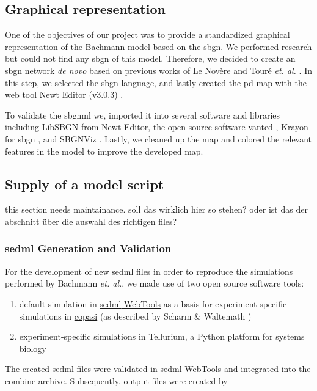 \subsection*{Graphical representation}
One of the objectives of our project was to provide a standardized graphical representation of the Bachmann model based on the \ac{sbgn}. We performed research but could not find any \ac{sbgn} of this model. Therefore, we decided to create an \ac{sbgn} network \textit{de novo} based on previous works of Le Novère \cite{sbgnnovere} and Touré \textit{et. al.} \cite{sbgntoure}. In this step, we selected the \ac{sbgn} language, and lastly created the \ac{pd} map with the web tool Newt Editor (v3.0.3) \cite{newteditor}. 

To validate the \ac{sbgnml} we, imported it into several software and libraries including LibSBGN from Newt Editor, the open-source software \ac{vanted} \cite{vanted}, Krayon for \ac{sbgn} \cite{krayon}, and SBGNViz \cite{sbgnviz}. Lastly, we cleaned up the map and colored the relevant features in the model to improve the developed map.

\subsection*{Supply of a model script}
\textsf{this section needs maintainance. soll das wirklich hier so stehen? oder ist das der abschnitt über die auswahl des richtigen files?}
\subsubsection*{\acs{sedml} Generation and Validation}
For the development of new \ac{sedml} files in order to reproduce the simulations performed by Bachmann \textit{et. al.}, we made use of two open source software tools:
\begin{enumerate}
    \item default simulation in \hyperlink{http://sysbioapps.spdns.org/SED-ML_Web_Tools}{\ac{sedml} WebTools} as a basis for experiment-specific simulations in \hyperlink{http://copasi.org/}{\ac{copasi}} (as described by Scharm \& Waltemath \cite{combine})
    \item experiment-specific simulations in Tellurium, a Python platform for systems biology \cite{tellurium}
\end{enumerate}

The created \ac{sedml} files were validated in \ac{sedml} WebTools and integrated into the \ac{combine} archive. Subsequently, output files were created by

